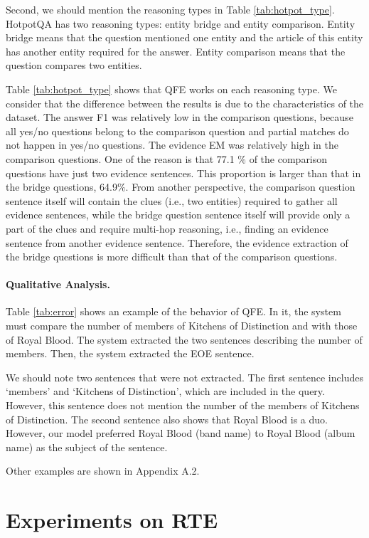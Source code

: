 \documentclass[11pt,a4paper]{article}
\theoremstyle{definition}
\begin{document}
    Second, we should mention the reasoning types in Table \ref{tab:hotpot_type}. HotpotQA has two reasoning types: entity bridge and entity comparison. Entity bridge means that the question mentioned one entity and the article of this entity has another entity required for the answer. Entity comparison means that the question compares two entities. 
    
    Table \ref{tab:hotpot_type} shows that QFE works on each reasoning type. 
	We consider that the difference between the results is due to the characteristics of the dataset.
	The answer F1 was relatively low in the comparison questions, 
	because all yes/no questions belong to the comparison question
	and partial matches do not happen in yes/no questions.
	The evidence EM was relatively high in the comparison questions.
	One of the reason is that 77.1 \% of the comparison questions have just two evidence sentences.
	This proportion is larger than that in the bridge questions, 64.9\%.
From another perspective, the comparison question sentence itself will contain the clues (i.e., two entities) required to gather all evidence sentences, while the bridge question sentence itself will provide only a part of the clues and require multi-hop reasoning, i.e., finding an evidence sentence from another evidence sentence.
	Therefore, the evidence extraction of the bridge questions is more difficult than that of the comparison questions.

	\paragraph{Qualitative Analysis.}
    Table \ref{tab:error} shows an example of the behavior of QFE. In it, the system must compare the number of members of Kitchens of Distinction and with those of Royal Blood. The system extracted the two sentences describing the number of members.
	Then, the system extracted the EOE sentence.
	
	We should note two sentences that were not extracted. The first sentence includes `members' and `Kitchens of Distinction', which are included in the query. However, this sentence does not mention the number of the members of Kitchens of Distinction. The second sentence also shows that Royal Blood is a duo.
	However, our model preferred Royal Blood (band name) to Royal Blood (album name) as the subject of the sentence.
	
	Other examples are shown in Appendix A.2.
	
	\section{Experiments on RTE}
\end{document}

